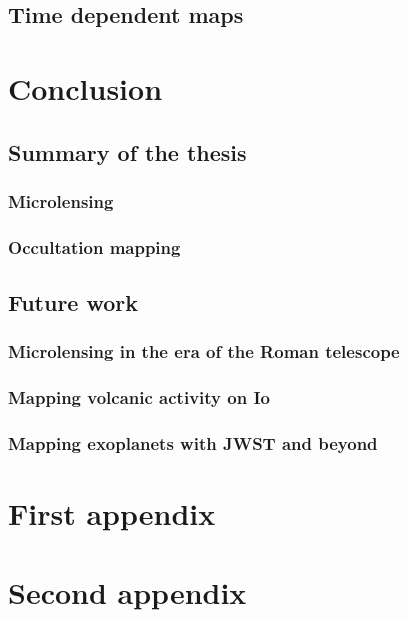 \documentclass[]{report}
\begin{document}
\section{Time dependent maps}

\chapter{Conclusion}
\section{Summary of the thesis}
\subsection{Microlensing}
\subsection{Occultation mapping}
\section{Future work}
\subsection{Microlensing in the era of the Roman telescope}
\subsection{Mapping volcanic activity on Io}
\subsection{Mapping exoplanets with JWST and beyond}

\appendix

\chapter{First appendix}
\chapter{Second appendix}
\end{document}
